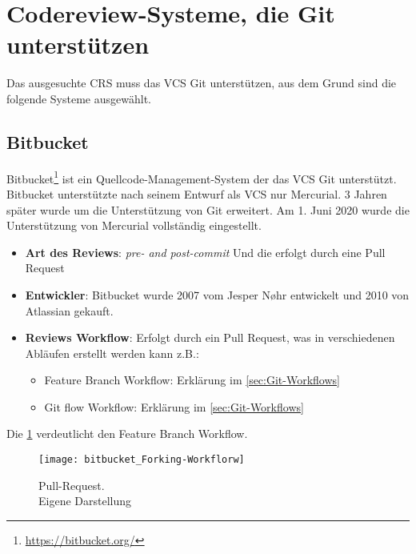 \section{Codereview-Systeme, die Git unterstützen}
\label{sec:CRS-Git}

Das ausgesuchte \ac{CRS} muss das \ac{VCS} Git unterstützen, aus dem Grund sind die folgende Systeme ausgewählt.

\subsection{Bitbucket}
\label{subsec:Bitbucket}

Bitbucket\footnote{\url{https://bitbucket.org/}} ist ein Quellcode-Management-System der das \ac{VCS} Git unterstützt. Bitbucket unterstützte nach seinem Entwurf als \ac{VCS} nur Mercurial. 3 Jahren später wurde um die Unterstützung von Git erweitert. Am 1. Juni 2020 wurde die Unterstützung von Mercurial vollständig eingestellt.

\begin{itemize}
	\item \textbf{Art des Reviews}: \textit{pre- and post-commit} Und die erfolgt durch eine Pull Request
	\item \textbf{Entwickler}: Bitbucket wurde 2007 vom Jesper Nøhr entwickelt und 2010 von Atlassian
		 gekauft.
	\item \textbf{Reviews Workflow}: Erfolgt durch ein Pull Request, was in verschiedenen Abläufen erstellt werden kann z.B.:
		\begin{itemize}
			\item Feature Branch Workflow: Erklärung im \cref{sec:Git-Workflows}
			\item Git flow Workflow: Erklärung im \cref{sec:Git-Workflows}
		\end{itemize}
\end{itemize}

Die \cref{fig:Forking-workflow} verdeutlicht den Feature Branch Workflow.

\begin{figure}[H]
	\centering
	\texttt{[image: bitbucket\_Forking-Workflorw]}
	\caption[Feature-Branch-Workflow]{Pull-Request.\\Eigene Darstellung}
	\label{fig:Forking-workflow}
\end{figure}

